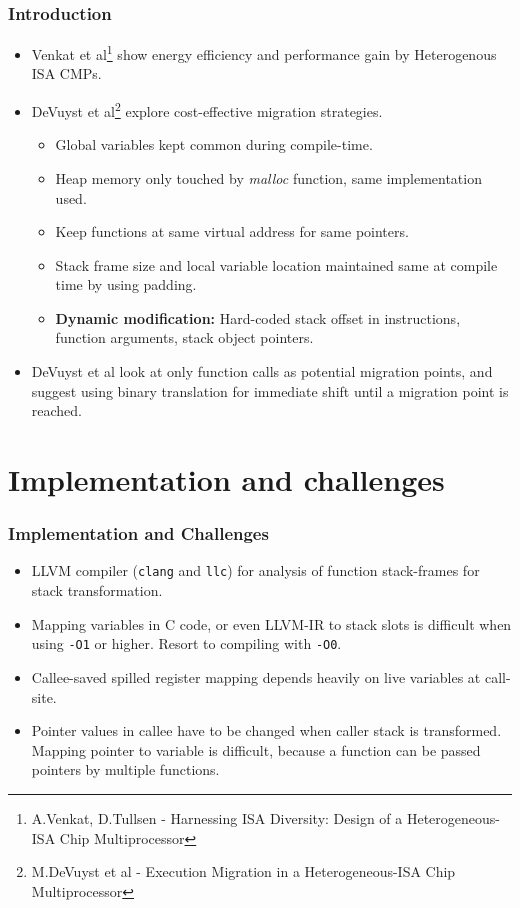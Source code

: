 \documentclass[10pt]{beamer}
\begin{document}
\begin{frame}
\frametitle{Introduction}
\begin{itemize}
\item Venkat et al\footnote{\tiny{A.Venkat, D.Tullsen - Harnessing ISA Diversity: Design of a Heterogeneous-ISA Chip Multiprocessor}}
    show energy efficiency and performance gain by Heterogenous ISA CMPs.
\item DeVuyst et al\footnote{\tiny{M.DeVuyst et al - Execution Migration in a Heterogeneous-ISA Chip Multiprocessor}} explore cost-effective migration strategies.
\begin{itemize}
    \item Global variables kept common during compile-time.
    \item Heap memory only touched by \textit{malloc} function, same implementation used.
    \item Keep functions at same virtual address for same pointers.
    \item Stack frame size and local variable location maintained same at compile time by using padding.
    \item \textbf{Dynamic modification:} Hard-coded stack offset in instructions, function arguments, stack object pointers.
\end{itemize}
\item DeVuyst et al look at only function calls as potential migration points, and suggest using binary translation for immediate shift until a migration point is reached.
\end{itemize}
\end{frame}

\section{Implementation and challenges}
\begin{frame}
\frametitle{Implementation and Challenges}
    \begin{itemize}
    \item LLVM compiler (\texttt{clang} and \texttt{llc}) for analysis of function stack-frames for stack transformation.
    \item Mapping variables in C code, or even LLVM-IR to stack slots is difficult when using \texttt{-O1} or higher. Resort to compiling with \texttt{-O0}.
    \item Callee-saved spilled register mapping depends heavily on live variables at call-site.
    \item Pointer values in callee have to be changed when caller stack is transformed. Mapping pointer to variable is difficult, because a function can be passed pointers by multiple functions.
    \end{itemize}
\end{frame}
\end{document}
